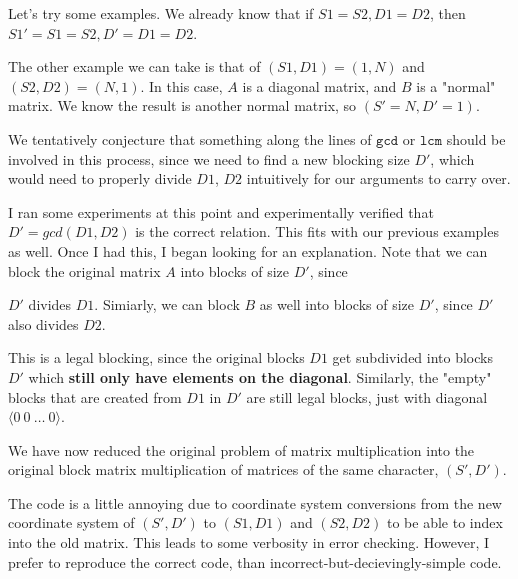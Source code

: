 \documentclass[11pt]{article}
\begin{document}
Let's try some examples. We already know that if $S1 = S2, D1 = D2$, then
$S1' = S1 = S2, D' = D1 = D2$.


The other example we can take is that of $(S1, D1) = (1, N)$ and $(S2, D2) =
(N, 1)$. In this case, $A$ is a diagonal matrix, and $B$ is a "normal" matrix.
We know the result is another normal matrix, so $(S' = N, D' = 1)$.


We tentatively conjecture that something along the lines of $\texttt{gcd}$
or $\texttt{lcm}$ should be involved in this process, since we need to find
a new blocking size $D'$, which would need to properly divide $D1$, $D2$ 
intuitively for our arguments to carry over. 


I ran some experiments at this point and experimentally verified that 
$D' = gcd(D1, D2)$ is the correct relation. This fits with our previous
examples as well. Once I had this, I began looking for an explanation.
Note that we can block the original matrix $A$ into blocks of size $D'$, since

$D'$ divides $D1$.  Simiarly, we can block $B$ as well into blocks of size
$D'$, since $D'$ also divides $D2$.

This is a legal blocking, since the original blocks $D1$ get subdivided into
blocks $D'$ which \textbf{still only have elements on the diagonal}. Similarly,
the "empty" blocks that are created from $D1$ in $D'$ are still legal blocks,
just with diagonal $\langle 0~0~\dots~0 \rangle$.


We have now reduced the original problem of matrix multiplication into the
original block matrix multiplication of matrices of the same character, $(S', D')$.

The code is a little annoying due to coordinate system conversions from the
new coordinate system of $(S', D')$ to $(S1, D1)$ and $(S2, D2)$ to be able
to index into the old matrix. This leads to some verbosity in error checking.
However, I prefer to reproduce the correct code, than 
incorrect-but-decievingly-simple code.
\end{document}
